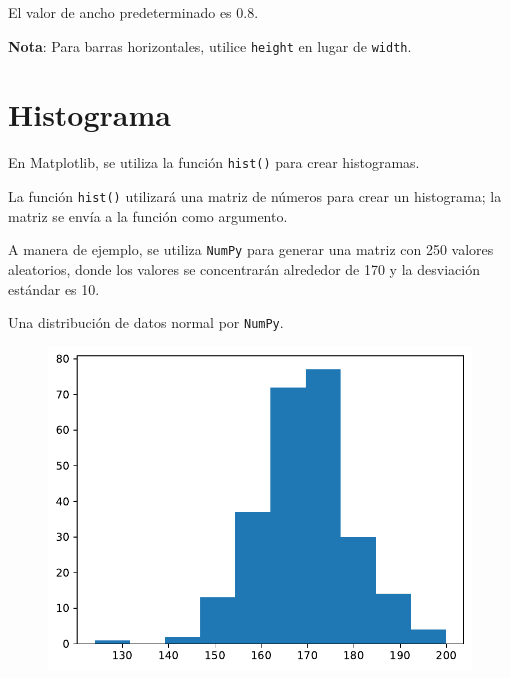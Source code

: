 El valor de ancho predeterminado es 0.8.

\textbf{Nota}: Para barras horizontales, utilice \texttt{height} en lugar de \texttt{width}.

\section{Histograma}

En Matplotlib, se utiliza la función \texttt{hist()} para crear histogramas.

La función \texttt{hist()} utilizará una matriz de números para crear un
histograma; la matriz se envía a la función como argumento.

A manera de ejemplo, se utiliza \texttt{NumPy} para generar una matriz
con 250 valores aleatorios, donde los valores se concentrarán alrededor
de 170 y la desviación estándar es 10. \\

\begin{code} Una distribución de datos normal por \texttt{NumPy}.

\begin{Shaded}
\begin{Highlighting}[]

\OperatorTok{=}\NormalTok{, }\NormalTok{, }\NormalTok{)}

\end{Highlighting}
\end{Shaded}

\begin{figure}
  \centering
  \includegraphics[scale=0.6]{img/grafica1049.pdf}
\end{figure}
\end{code}

